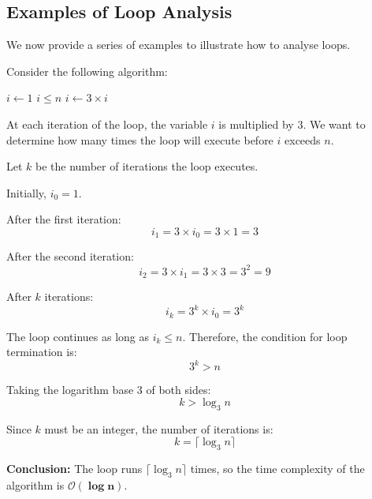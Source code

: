 \subsection*{Examples of Loop Analysis}
We now provide a series of examples to illustrate how to analyse loops.

\begin{example}

    Consider the following algorithm:
    
    \begin{codebox}
        \li $i \gets 1$
        \li \While $i \leq n$ \Do
        \li     $i \gets 3 \times i$
            \End
    \end{codebox}
    
    At each iteration of the \texttt{\While} loop, the variable $i$ is multiplied by $3$. We want to determine how many times the loop will execute before $i$ exceeds $n$.
    
    Let $k$ be the number of iterations the loop executes.
    
    Initially, $i_0 = 1$.
    
    After the first iteration:
    \[ i_1 = 3 \times i_0 = 3 \times 1 = 3 \]
    
    After the second iteration:
    \[ i_2 = 3 \times i_1 = 3 \times 3 = 3^2 = 9 \]
    
    After $k$ iterations:
    \[ i_k = 3^k \times i_0 = 3^k \]
    
    The loop continues as long as $i_k \leq n$. Therefore, the condition for loop termination is:
    \[ 3^k > n \]
    
    Taking the logarithm base $3$ of both sides:
    \[ k > \log_3 n \]
    
    Since $k$ must be an integer, the number of iterations is:
    \[ k = \lceil \log_3 n \rceil \]
    
    \textbf{Conclusion:} The loop runs $\lceil \log_3 n \rceil$ times, so the time complexity of the algorithm is $\boldsymbol{\mathcal{O}(\log n)}$.
    
\end{example}
    
